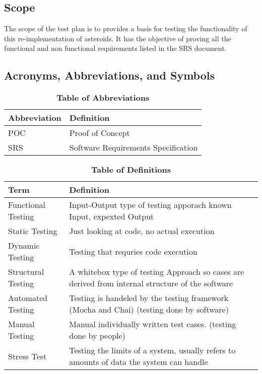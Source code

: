 \documentclass[12pt, titlepage]{article}
\begin{document}
\subsection{Scope}
The scope of the test plan is to provides a basis for testing the functionality of this re-implementation of asteroids. It has the objective of proving all the functional and non functional requirements listed in the SRS document.

\subsection{Acronyms, Abbreviations, and Symbols}

\begin{table}[hbp]
\caption{\textbf{Table of Abbreviations}} \label{Table}

\begin{tabularx}{\textwidth}{p{3cm}X}
\toprule
\textbf{Abbreviation} & \textbf{Definition} \\
\midrule
POC & Proof of Concept\\
SRS & Software Requirements Specification\\
\bottomrule
\end{tabularx}

\end{table}

\begin{table}[!htbp]
\caption{\textbf{Table of Definitions}} \label{Table}

\begin{tabularx}{\textwidth}{p{3cm}X}
\toprule
\textbf{Term} & \textbf{Definition}\\
\midrule
Functional Testing & Input-Output type of testing apporach known Input, expexted Output\\
Static Testing & Just looking at code, no actual execution\\
Dynamic Testing & Testing that requries code execution\\
Structural Testing & A whitebox type of testing Approach so cases are derived from internal structure of the software\\
Automated Testing & Testing is handeled by the testing framework (Mocha and Chai) (testing done by software)\\
Manual Testing & Manual individually written test cases. (testing done by people)\\
Stress Test & Testing the limits of a system, usually refers to amounts of data the system can handle\\
\bottomrule
\end{tabularx}

\end{table}
\end{document}
